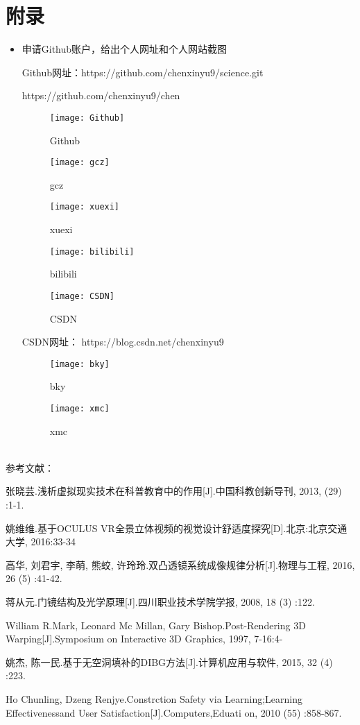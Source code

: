 \documentclass{article}
\begin{document}
\section{附录}
\begin{itemize}
    \item 申请Github账户，给出个人网址和个人网站截图\par
    Github网址：https://github.com/chenxinyu9/science.git\par
    https://github.com/chenxinyu9/chen\par

\begin{figure}[tph]
	\centering
	\texttt{[image: Github]}
	\caption{Github}
	\label{fig:Github}
\end{figure}
\begin{figure}[tph]
	\centering
	\texttt{[image: gcz]}
	\caption{gcz}
	\label{fig:gcz}
\end{figure}
\begin{figure}[tph]
	\centering
	\texttt{[image: xuexi]}
	\caption{xuexi}
	\label{fig:xuexi}
\end{figure}
\begin{figure}[tph]
	\centering
	\texttt{[image: bilibili]}
	\caption{bilibili}
	\label{fig:bilibili}
\end{figure}
\begin{figure}[tph]
	\centering
	\texttt{[image: CSDN]}
	\caption{CSDN}
	\label{fig:CSDN}
\end{figure}
    
   CSDN网址： https://blog.csdn.net/chenxinyu9
\begin{figure}[tph]
	\centering
	\texttt{[image: bky]}
	\caption{bky}
	\label{fig:bky}
\end{figure}
\begin{figure}[tph]
	\centering
	\texttt{[image: xmc]}
	\caption{xmc}
	\label{fig:xmc}
\end{figure}
\end{itemize}


\hspace*{\fill} \\

参考文献：\par
[1]张晓芸.浅析虚拟现实技术在科普教育中的作用[J].中国科教创新导刊, 2013, (29) :1-1.\par
[2]姚维维.基于OCULUS VR全景立体视频的视觉设计舒适度探究[D].北京:北京交通大学, 2016:33-34\par
[3]高华, 刘君宇, 李萌, 熊蛟, 许玲玲.双凸透镜系统成像规律分析[J].物理与工程, 2016, 26 (5) :41-42.\par
[4]蒋从元.门镜结构及光学原理[J].四川职业技术学院学报, 2008, 18 (3) :122.\par
[5]William R.Mark, Leonard Mc Millan, Gary Bishop.Post-Rendering 3D Warping[J].Symposium on Interactive 3D Graphics, 1997, 7-16:4-\par
[6]姚杰, 陈一民.基于无空洞填补的DIBG方法[J].计算机应用与软件, 2015, 32 (4) :223.\par
[7]Ho Chunling, Dzeng Renjye.Constrction Safety via Learning;Learning Effectivenessand User Satisfaction[J].Computers,Eduati on, 2010 (55) :858-867.\par
\end{document}
